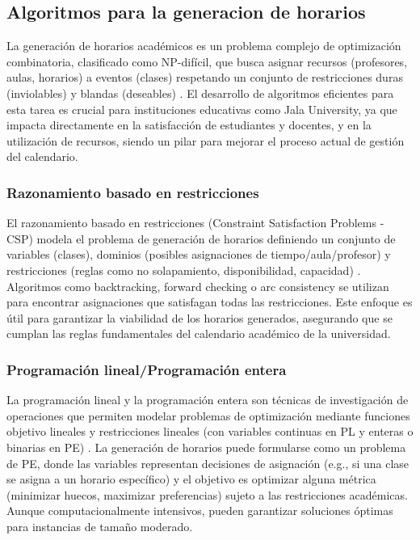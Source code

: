 \subsection{Algoritmos para la generacion de horarios}
La generación de horarios académicos es un problema complejo de optimización combinatoria, clasificado como NP-difícil, que busca asignar recursos (profesores, aulas, horarios) a eventos (clases) respetando un conjunto de restricciones duras (inviolables) y blandas (deseables) \parencite{Schaerf1999}.
El desarrollo de algoritmos eficientes para esta tarea es crucial para instituciones educativas como Jala University, ya que impacta directamente en la satisfacción de estudiantes y docentes, y en la utilización de recursos, siendo un pilar para mejorar el proceso actual de gestión del calendario.

\subsubsection{Razonamiento basado en restricciones}
El razonamiento basado en restricciones (Constraint Satisfaction Problems - CSP) modela el problema de generación de horarios definiendo un conjunto de variables (clases), dominios (posibles asignaciones de tiempo/aula/profesor) y restricciones (reglas como no solapamiento, disponibilidad, capacidad) \parencite{Rossi2006}.
Algoritmos como backtracking, forward checking o arc consistency se utilizan para encontrar asignaciones que satisfagan todas las restricciones.
Este enfoque es útil para garantizar la viabilidad de los horarios generados, asegurando que se cumplan las reglas fundamentales del calendario académico de la universidad.

\subsubsection{Programación lineal/Programación entera}
La programación lineal y la programación entera son técnicas de investigación de operaciones que permiten modelar problemas de optimización mediante funciones objetivo lineales y restricciones lineales (con variables continuas en PL y enteras o binarias en PE) \parencite{Winston2004}.
La generación de horarios puede formularse como un problema de PE, donde las variables representan decisiones de asignación (e.g., si una clase se asigna a un horario específico) y el objetivo es optimizar alguna métrica (minimizar huecos, maximizar preferencias) sujeto a las restricciones académicas.
Aunque computacionalmente intensivos, pueden garantizar soluciones óptimas para instancias de tamaño moderado.

